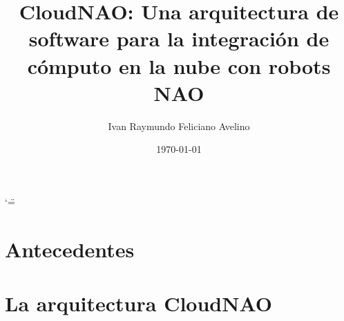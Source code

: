 \documentclass[letterpaper,12pt,spanish]{report}
\title{CloudNAO: Una arquitectura de software para la integración de
cómputo en la nube con robots NAO}
\date{\today}
\author{Ivan Raymundo Feliciano Avelino}
\begin{document}
\ifnum\catcode`\"=\active{}\fi
\maketitle
\sphinxtableofcontents
{}\label{\detokenize{index::doc}}








\chapter{Antecedentes}
\label{\detokenize{chapter_one:antecedentes}}\label{\detokenize{chapter_one::doc}}









\chapter{La arquitectura CloudNAO}
\label{\detokenize{chapter_two:la-arquitectura-cloudnao}}\label{\detokenize{chapter_two::doc}}









\end{document}
